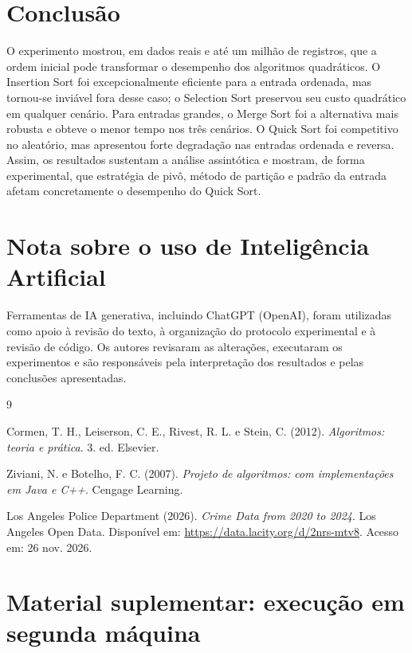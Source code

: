 \documentclass[12pt]{article}
\begin{document}
\section{Conclusão}

O experimento mostrou, em dados reais e até um milhão de registros, que a ordem
inicial pode transformar o desempenho dos algoritmos quadráticos. O Insertion
Sort foi excepcionalmente eficiente para a entrada ordenada, mas tornou-se
inviável fora desse caso; o Selection Sort preservou seu custo quadrático em
qualquer cenário. Para entradas grandes, o Merge Sort foi a alternativa mais
robusta e obteve o menor tempo nos três cenários. O Quick Sort foi competitivo
no aleatório, mas apresentou forte degradação nas entradas ordenada e reversa.
Assim, os resultados sustentam a análise assintótica e mostram, de forma
experimental, que estratégia de pivô, método de partição e padrão da entrada
afetam concretamente o desempenho do Quick Sort.

\section*{Nota sobre o uso de Inteligência Artificial}

Ferramentas de IA generativa, incluindo ChatGPT (OpenAI), foram utilizadas como
apoio à revisão do texto, à organização do protocolo experimental e à revisão
de código. Os autores revisaram as alterações, executaram os experimentos e são
responsáveis pela interpretação dos resultados e pelas conclusões apresentadas.

\begin{thebibliography}{9}

Cormen, T. H., Leiserson, C. E., Rivest, R. L. e Stein, C. (2012).
\textit{Algoritmos: teoria e prática}. 3. ed. Elsevier.

Ziviani, N. e Botelho, F. C. (2007).
\textit{Projeto de algoritmos: com implementações em Java e C++}.
Cengage Learning.

Los Angeles Police Department (2026).
\textit{Crime Data from 2020 to 2024}. Los Angeles Open Data.
Disponível em: \url{https://data.lacity.org/d/2nrs-mtv8}. Acesso em:
26 nov. 2026.

\end{thebibliography}

\section*{Material suplementar: execução em segunda máquina}
\end{document}
